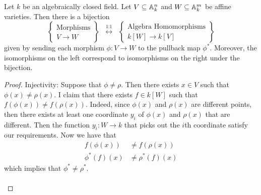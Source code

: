 \documentclass[a4paper]{article}
\begin{document}
\begin{prp}{}{} Let $k$ be an algebraically closed field. Let $V\subseteq\mathbb{A}_k^n$ and $W\subseteq\mathbb{A}_k^m$ be affine varieties. Then there is a bijection $$\left\{\substack{\text{Morphisms}\\ V\to W}\right\}\;\;\overset{\text{1:1}}{\longleftrightarrow}\;\;\left\{\substack{\text{Algebra Homomorphisms}\\ k[W]\to k[V]}\right\}$$ given by sending each morphism $\phi:V\to W$ to the pullback map $\phi^\ast$. Moreover, the isomorphisms on the left correspond to isomorphisms on the right under the bijection. \tcbline
\begin{proof}
Injectivity: Suppose that $\phi\neq\rho$. Then there exists $x\in V$ such that $\phi(x)\neq\rho(x)$. I claim that there exists $f\in k[W]$ such that $f(\phi(x))\neq f(\rho(x))$. Indeed, since $\phi(x)$ and $\rho(x)$ are different points, then there exists at least one coordinate $y_i$ of $\phi(x)$ and $\rho(x)$ that are different. Then the function $y_i:W\to k$ that picks out the $i$th coordinate satisfy our requirements. Now we have that 
\begin{align*}
f(\phi(x))&\neq f(\rho(x))\\
\phi^\ast(f)(x)&\neq\rho^\ast(f)(x)
\end{align*}
which implies that $\phi^\ast\neq\rho^\ast$. \\~\\


\end{proof}
\end{prp}
\end{document}
